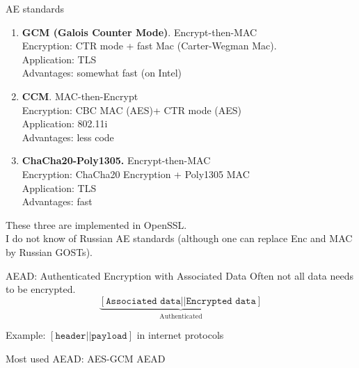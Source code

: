 \documentclass[usenames,dvipsnames, 9pt]{beamer}
\begin{document}
\begin{frame}{AE standards}
\LARGE
\begin{enumerate}
	 pt
	\item \textbf{GCM (Galois Counter Mode)}. {\Large {\color{Orange}Encrypt-then-MAC}  \\
		Encryption: CTR mode + fast Mac (Carter-Wegman Mac).  \\
		Application: TLS \\
		Advantages: somewhat fast (on Intel)
	 }
 \pause
 	\item \textbf{CCM}.  {\Large {\color{Orange}MAC-then-Encrypt}  \\
 		Encryption: CBC MAC (AES)+ CTR mode (AES)  \\
 		Application: 802.11i \\
 		Advantages: less code
 	}
 \pause
 	\item \textbf{ChaCha20-Poly1305.} {\Large {\color{Orange} Encrypt-then-MAC}  \\
 		Encryption: ChaCha20 Encryption + Poly1305 MAC \\
 		Application: TLS \\
 		Advantages: fast
 	}
\end{enumerate}
\pause
\vspace{10pt}
These three are implemented in OpenSSL. \\
I do not know of Russian AE standards (although one can replace Enc and MAC by Russian GOSTs).
\end{frame}

\begin{frame}{AEAD: Authenticated Encryption with Associated Data }
	\Large
	Often not all data needs to be encrypted.\\
	
	\LARGE
	\[
	\underbrace{
	\left[
	\texttt{Associated data} ||
	\texttt{Encrypted data}
	\right]
	}_\text{Authenticated}
	\]
	
	\vspace{25pt}
	
	Example: $[\texttt{header} || \texttt{payload} ]$ in internet protocols\\
	
	\vspace{25pt}

	Most used AEAD: {\color{Orange}AES-GCM AEAD}
	
\end{frame}
\end{document}
